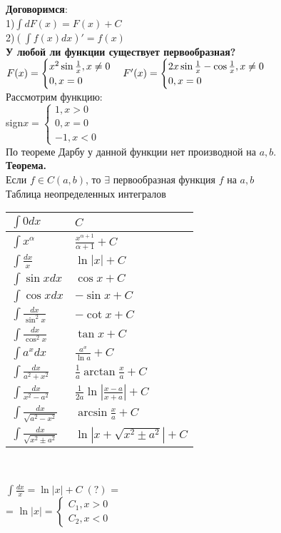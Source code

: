 \documentclass[14pt]{article}
\begin{document}
	\textbf{Договоримся}: \\
	1)$\int dF(x)=F(x)+C$ \\
	2)$(\int f(x)dx)'=f(x)$ \\
	\textbf{У любой ли функции существует первообразная?} \\
	$F(x) = \begin{cases}
		x^2 \sin \frac{1}{x}, x \neq 0 \\
		0, x=0
	\end{cases} \\
	F'(x)=\begin{cases}
		2x\sin \frac{1}{x} - \cos \frac{1}{x}, x \neq 0 \\
		0, x=0
	\end{cases}$ \\
	Рассмотрим функцию: \\
	sign$x = \begin{cases}
		1, x>0 \\
		0, x=0 \\
		-1, x<0
	\end{cases}$ \\
	По теореме Дарбу у данной функции нет производной на $a,b$. \\
	\textbf{Теорема.} \\
	Если $f \in C (a,b)$, то $\exists$ первообразная функция $f$ на $a,b$ \\
	Таблица неопределенных интегралов \\
	\begin{center}
	\begin{tabular}{| l | l |}
		\hline 
		$\int 0 dx$ & $C$ \\
		\hline
		$\int x^{\alpha}$ & $\frac{x^{\alpha+1}}{\alpha+1} + C$ \\
		\hline 
		$\int \frac{dx}{x}$ & $\ln|x| + C$ \\
		\hline 
		$\int \sin x dx$ & $\cos x + C$ \\
		\hline 
		$\int \cos x dx$ & $-\sin x + C$ \\
		\hline 
		$\int \frac{dx}{\sin^2 x}$ & $-\cot x + C$ \\
		\hline 
		$\int \frac{dx}{\cos^2 x}$ & $\tan x + C$ \\
		\hline 
		$\int a^x dx$ & $\frac{a^x}{\ln a} + C$ \\
		\hline 
		$\int \frac{dx}{a^2 + x^2} $ & $\frac{1}{a}\arctan \frac{x}{a} + C$ \\
		\hline 
		$\int \frac{dx}{x^2 - a^2} $ & $\frac{1}{2a} \ln |\frac{x-a}{x+a}|+C$ \\
		\hline 
		$\int \frac{dx}{\sqrt{a^2-x^2}}$ & $\arcsin\frac{x}{a} + C$ \\
		\hline 
		$\int \frac{dx}{\sqrt{x^2 \pm a^2}}$ & $\ln |x+\sqrt{x^2 \pm a^2}| + C$ \\
		\hline  
	\end{tabular} \\
	\end{center}
	$\int \frac{dx}{x} = \ln |x| + C \; (?)$ = \\
	= $\ln|x| = \begin{cases}
		C_1, x>0 \\
		C_2, x<0
	\end{cases}$ \\
\end{document}
